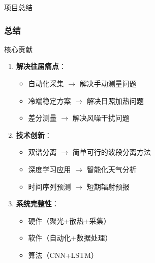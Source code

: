 \documentclass[aspectratio=169,11pt]{ctexbeamer}
\begin{document}
\begin{frame}{项目总结}
\frametitle{总结}
\begin{block}{核心贡献}
\begin{enumerate}
    \item \textbf{解决往届痛点}：
    \begin{itemize}
        \item 自动化采集 $\rightarrow$ 解决手动测量问题
        \item 冷端稳定方案 $\rightarrow$ 解决日照加热问题
        \item 差分测量 $\rightarrow$ 解决风噪干扰问题
    \end{itemize}
    
    \item \textbf{技术创新}：
    \begin{itemize}
        \item 双谱分离 $\rightarrow$ 简单可行的波段分离方法
        \item 深度学习应用 $\rightarrow$ 智能化天气分析
        \item 时间序列预测 $\rightarrow$ 短期辐射预报
    \end{itemize}
    
    \item \textbf{系统完整性}：
    \begin{itemize}
        \item 硬件（聚光+散热+采集）
        \item 软件（自动化+数据处理）
        \item 算法（CNN+LSTM）
    \end{itemize}
\end{enumerate}
\end{block}
\end{frame}
\end{document}
